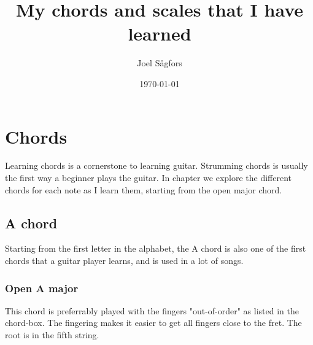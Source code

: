 \documentclass[11pt]{book}
\title{My chords and scales that I have learned}
\author{Joel Sågfors}
\date{\today}
\begin{document}
    \maketitle


    \chapter{Chords}
    Learning chords is a cornerstone to learning guitar. Strumming chords is usually the first way a beginner plays the guitar.
    In chapter we explore the different chords for each note as I learn them, starting from the open major chord.


    \section{A chord}
    Starting from the first letter in the alphabet, the A chord is also one of the first chords that a guitar player learns,
    and is used in a lot of songs.

    \subsection{Open A major}
    This chord is preferrably played with the fingers "out-of-order" as listed in the chord-box.
    The fingering makes it easier to get all fingers close to the fret.
    The root is in the fifth string.

    \chordscheme[
    name   = A,
    finger = {2/4:2,2/3:1,2/2:3},
    ring   = {5,1},
    mute   = {6}
    ]
\end{document}
